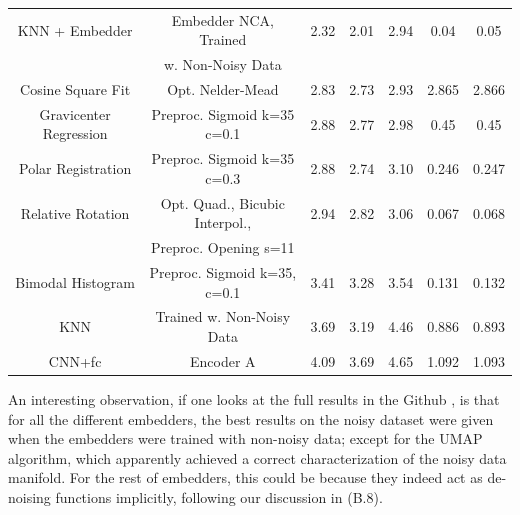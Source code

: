 \documentclass[11pt, a4paper, twoside]{article} %
\begin{document}
\begin{table}[h!]
{\begin{tabular}{c|c|c|cc|cc}
           KNN + Embedder & Embedder NCA, Trained  &  2.32 &       2.01 &      2.94 &         0.04 &        0.05 \\ 
                    &         w. Non-Noisy Data   &       &            &           &              &             \\ \hline
        \rule{0pt}{4mm}{}Cosine Square Fit &                        Opt. Nelder-Mead &  2.83 &       2.73 &      2.93 &         2.865 &        2.866 \\ \hline
   \rule{0pt}{4mm}{}Gravicenter Regression &             Preproc. Sigmoid k=35 c=0.1 &  2.88 &       2.77 &      2.98 &         0.45 &        0.45 \\ \hline
       \rule{0pt}{4mm}{}Polar Registration &             Preproc. Sigmoid k=35 c=0.3 &  2.88 &       2.74 &      3.10 &         0.246 &        0.247 \\ \hline
        \rule{0pt}{4mm}{}Relative Rotation &         Opt. Quad., Bicubic Interpol.,  &  2.94 &       2.82 &      3.06 &         0.067 &        0.068 \\ 
                          &                   Preproc. Opening s=11 &       &            &           &              &             \\ \hline
        \rule{0pt}{4mm}{}Bimodal Histogram &            Preproc. Sigmoid k=35, c=0.1 &  3.41 &       3.28 &      3.54 &         0.131 &        0.132 \\ \hline
                   \rule{0pt}{4mm}{}
                   
KNN & Trained w. Non-Noisy Data & 3.69 &	3.19 &	4.46 &	0.886 &	0.893 \\ \hline\rule{0pt}{4mm}{}                   
                   
                   CNN+fc &                               Encoder A &  4.09 &       3.69 &      4.65 &         1.092 &        1.093 \\
\bottomrule
\end{tabular}
}
\end{table}

An interesting observation, if one looks at the full results in the Github \cite{github}, is that for all the different embedders, the best results on the noisy dataset were given when the embedders were trained with non-noisy data; except for the UMAP algorithm, which apparently achieved a correct characterization of the noisy data manifold. For the rest of embedders, this could be because they indeed act as de-noising functions implicitly, following our discussion in (B.8). 
\end{document}
